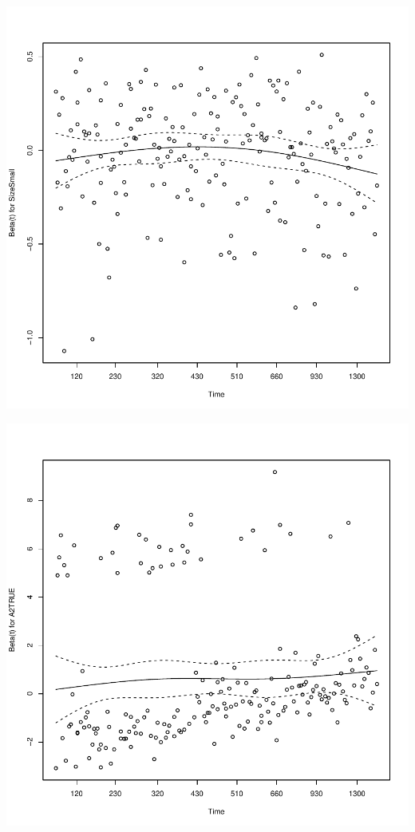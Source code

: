 \documentclass{article}\usepackage[]{graphicx}\usepackage[]{color}
\makeatletter
\def\maxwidth{ %
  \ifdim\Gin@nat@width>\linewidth
    \linewidth
  \else
    \Gin@nat@width
  \fi
}
\newenvironment{knitrout}{}{} %
\makeatother
\begin{document}
\begin{knitrout}
{}




{\centering \includegraphics[width=\maxwidth]{figure/eda-ph-check-full-6} 

}




{\centering \includegraphics[width=\maxwidth]{figure/eda-ph-check-full-7} 

}
\end{knitrout}
\end{document}
